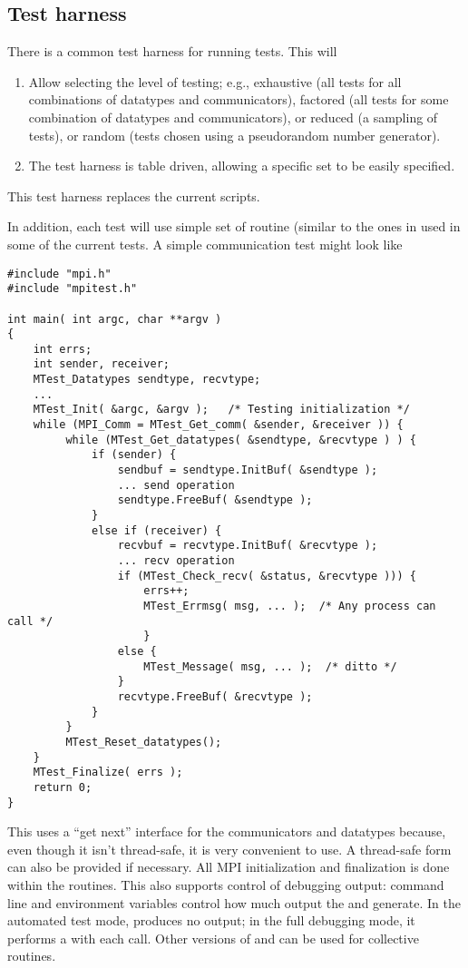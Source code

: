 \documentclass{article}
\begin{document}
\subsection{Test harness}
There is a common test harness for running tests.  This will
\begin{enumerate}
\item Allow selecting the level of testing; e.g., exhaustive (all
tests for all combinations of datatypes and communicators), factored
(all tests for some combination of datatypes and communicators), or
reduced (a sampling of tests), or random (tests chosen using a
pseudorandom number generator).  

\item The test harness is table driven, allowing a specific set to be
easily specified.  
\end{enumerate}
This test harness replaces the current  scripts.

In addition, each test will use simple set of routine (similar to the
ones in  used in some of the current tests.  A simple
communication test might look like
\begin{verbatim}
#include "mpi.h"
#include "mpitest.h"

int main( int argc, char **argv )
{
    int errs;
    int sender, receiver;
    MTest_Datatypes sendtype, recvtype;
    ...
    MTest_Init( &argc, &argv );   /* Testing initialization */
    while (MPI_Comm = MTest_Get_comm( &sender, &receiver )) {
         while (MTest_Get_datatypes( &sendtype, &recvtype ) ) {
             if (sender) {
                 sendbuf = sendtype.InitBuf( &sendtype );
                 ... send operation
                 sendtype.FreeBuf( &sendtype );
             } 
             else if (receiver) {
                 recvbuf = recvtype.InitBuf( &recvtype );
                 ... recv operation
                 if (MTest_Check_recv( &status, &recvtype ))) {
                     errs++;
                     MTest_Errmsg( msg, ... );  /* Any process can call */
                     }
                 else {
                     MTest_Message( msg, ... );  /* ditto */
                 }
                 recvtype.FreeBuf( &recvtype );
             }
         }
         MTest_Reset_datatypes();
    }
    MTest_Finalize( errs );
    return 0;
}
\end{verbatim}
This uses a ``get next'' interface for the communicators and datatypes
because, even though it isn't thread-safe, it is very convenient to
use.  A thread-safe form can also be provided if necessary.  All MPI
initialization and finalization is done within the 
routines.  This also supports control of debugging output: command
line and environment variables control how much output the
 and  generate.  In the
automated test mode,  produces no output; in the
full debugging mode, it performs a  with each
call.  Other versions of  and
 can be used for collective routines.
\end{document}
